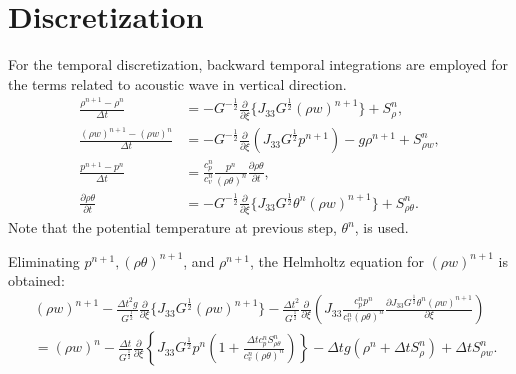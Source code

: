 \section{Discretization}

For the temporal discretization, backward temporal integrations are employed for the terms related to acoustic wave in vertical direction.
\begin{align}
  \frac{\rho^{n+1}-\rho^n}{\Delta t}
  &= -G^{-\frac{1}{2}}\frac{\partial}{\partial \xi}\{J_{33}G^{\frac{1}{2}}(\rho w)^{n+1}\} + S_\rho^n, \\
  \frac{(\rho w)^{n+1}-(\rho w)^n}{\Delta t}
  &= -G^{-\frac{1}{2}}\frac{\partial}{\partial \xi}(J_{33}G^{\frac{1}{2}}p^{n+1}) -g\rho^{n+1} + S_{\rho w}^n, \\
  \frac{p^{n+1} - p^n}{\Delta t}
  &= \frac{c_p^n}{c_v^n} \frac{p^n}{(\rho\theta)^n}\frac{\partial \rho\theta}{\partial t}, \\
  \frac{\partial \rho\theta}{\partial t}
  &= -G^{-\frac{1}{2}}\frac{\partial}{\partial \xi}\{J_{33}G^{\frac{1}{2}}\theta^n (\rho w)^{n+1}\} + S_{\rho\theta}^n.
\end{align}
Note that the potential temperature at previous step, $\theta^n$, is used.

Eliminating $p^{n+1}, (\rho\theta)^{n+1}$, and $\rho^{n+1}$, the Helmholtz equation for $(\rho w)^{n+1}$ is obtained:
\begin{align}
  &
  (\rho w)^{n+1}
  - \frac{\Delta t^2 g}{G^{\frac{1}{2}}}\frac{\partial}{\partial \xi} \{J_{33}G^{\frac{1}{2}}(\rho w)^{n+1}\}
  - \frac{\Delta t^2}{G^{\frac{1}{2}}}\frac{\partial}{\partial \xi}\left(J_{33}\frac{c_p^n p^n}{c_v^n (\rho\theta)^n}\frac{\partial J_{33}G^{\frac{1}{2}}\theta^n (\rho w)^{n+1}}{\partial \xi}\right) \nonumber\\
  &= (\rho w)^n
  - \frac{\Delta t}{G^{\frac{1}{2}}}\frac{\partial}{\partial \xi}\left\{J_{33}G^{\frac{1}{2}}p^n\left(1+\frac{\Delta t c_p^n S_{\rho\theta}^n}{c_v^n (\rho\theta)^n}\right)\right\}
  - \Delta t g (\rho^n + \Delta t S_\rho^n)
  + \Delta t S_{\rho w}^n.
\end{align}

